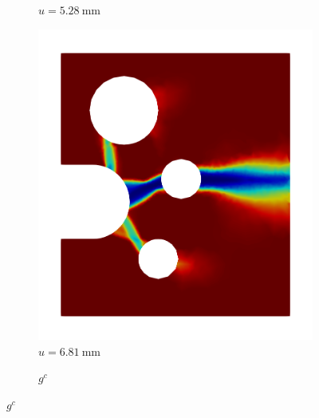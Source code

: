 \begin{figure}[!htb]
\begin{subfigure}{0.17\textwidth}
    \caption{$u = \SI{5.28}{\milli\meter}$}
    \label{fig: Chapter5/SFC/gc_2}
  \end{subfigure}
  \hspace{0.03\textwidth}
  \begin{subfigure}{0.17\textwidth}
    \centering
    \includegraphics[width=\textwidth,scale=0.5]{Chapter5/figures/SFC/M_3}
    \caption{$u = \SI{6.81}{\milli\meter}$}
    \label{fig: Chapter5/SFC/gc_3}
  \end{subfigure}
  \begin{subfigure}{0.04\textwidth}
    \centering
    \caption*{$g^c$}

\end{subfigure}
\end{figure}
